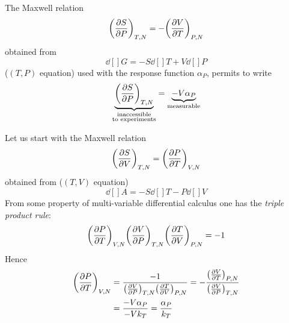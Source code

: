 \documentclass[../../Main/Main.tex]{subfiles}
\begin{document}
\begin{example}{}{}
  The Maxwell relation
  \begin{equation*}
    \qty(\pdv{S}{P} )_{T,N} = - \qty(\pdv{V}{T} )_{P,N}
  \end{equation*}
  obtained from
  \begin{equation*}
\dd[]{G} = - S \dd[]{T} + V \dd[]{P}
  \end{equation*}
  (\( (T,P) \) equation) used with the response function \( \alpha _P \), permits to write
\begin{equation}
  \underbrace{\qty(\pdv{S}{P} )_{T,N}}_{\substack{ \text{inaccessible} \\  \text{to experiments} } }  = \underbrace{- V \alpha _P}_{\text{measurable}}
  \label{eq:}
\end{equation}
\end{example}
\begin{example}{}{}
Let us start with the Maxwell relation
\begin{equation*}
  \qty(\pdv{S}{V} )_{T,N} =  \qty(\pdv{P}{T} )_{V,N}
\end{equation*}
obtained from   (\( (T,V) \) equation)
\begin{equation*}
    \dd[]{A} = - S \dd[]{T} - P \dd[]{V}
\end{equation*}
From some property of multi-variable differential calculus one has the \textit{triple product rule}:
\begin{equation*}
    \qty(\pdv{P}{T} )_{V,N}  \qty(\pdv{V}{P} )_{T,N}   \qty(\pdv{T}{V} )_{P,N} =-1
\end{equation*}
Hence
\begin{equation}
\begin{split}
    \qty(\pdv{P}{T} )_{V,N} &= \frac{-1}{ \qty(\pdv{V}{P} )_{T,N}   \qty(\pdv{T}{V} )_{P,N} }  = - \frac{  \qty(\pdv{V}{T} )_{P,N} }{   \qty(\pdv{V}{P} )_{T,N} } \\
    &= \frac{-V \alpha _P}{-V k_T} = \frac{\alpha _P}{k _T}
\end{split}
  \label{eq:}
\end{equation}
\end{example}
\end{document}
